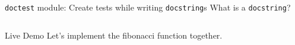     \begin{frame}{\texttt{doctest} module: Create tests while writing \texttt{docstring}s}
      \LARGE
      What is a \texttt{docstring}?
      \inputminted[frame=single,framesep=2pt]{python3}{docstring.py}
    \end{frame}

    \begin{frame}{Live Demo}
      \huge
      Let's implement the fibonacci function together.
    \end{frame}

